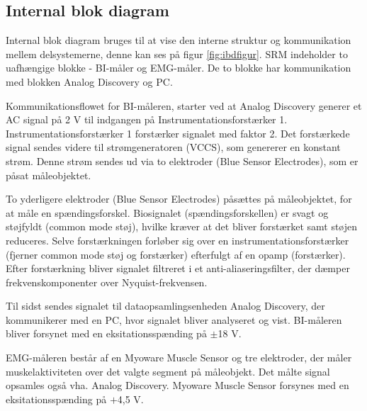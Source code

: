 \subsection{Internal blok diagram}

Internal blok diagram bruges til at vise den interne struktur og kommunikation mellem delsystemerne, denne kan ses på figur \ref{fig:ibdfigur}. SRM indeholder to uafhængige blokke - BI-måler og EMG-måler. De to blokke har kommunikation med blokken Analog Discovery og PC. 

Kommunikationsflowet for BI-måleren, starter ved at Analog Discovery generer et AC signal på 2 V til indgangen på Instrumentationsforstærker 1. Instrumentationsforstærker 1 forstærker signalet med faktor 2. Det forstærkede signal sendes videre til strømgeneratoren (VCCS), som genererer en konstant strøm. Denne strøm sendes ud via to elektroder (Blue Sensor Electrodes), som er påsat måleobjektet. 

To yderligere elektroder (Blue Sensor Electrodes) påsættes på måleobjektet, for at måle en spændingsforskel. Biosignalet (spændingsforskellen) er svagt og støjfyldt (common mode støj), hvilke kræver at det bliver forstærket samt støjen reduceres. Selve forstærkningen forløber sig over en instrumentationsforstærker (fjerner common mode støj og forstærker) efterfulgt af en opamp (forstærker). Efter forstærkning bliver signalet filtreret i et anti-aliaseringsfilter, der dæmper frekvenskomponenter over Nyquist-frekvensen. 

Til sidst sendes signalet til dataopsamlingsenheden Analog Discovery, der kommunikerer med en PC, hvor signalet bliver analyseret og vist. BI-måleren bliver forsynet med en eksitationsspænding på $\pm$18 V.

EMG-måleren består af en Myoware Muscle Sensor og tre elektroder, der måler muskelaktiviteten over det valgte segment på måleobjekt. Det målte signal opsamles også vha. Analog Discovery. Myoware Muscle Sensor forsynes med en eksitationsspænding på $+$4,5 V.


